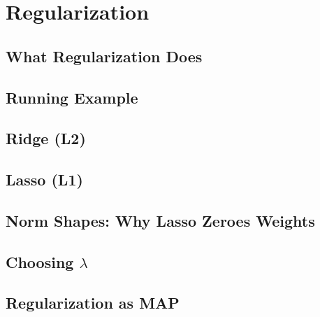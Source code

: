 \section*{Regularization}

\subsection*{What Regularization Does}

\subsection*{Running Example}

\subsection*{Ridge (L2)}

\subsection*{Lasso (L1)}

\subsection*{Norm Shapes: Why Lasso Zeroes Weights}

\subsection*{Choosing $\lambda$}

\subsection*{Regularization as MAP}
